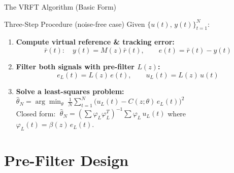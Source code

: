 \documentclass[hyperref={pdfpagemode=FullScreen},aspectratio=169]{beamer}
\begin{document}
\begin{frame}{The VRFT Algorithm (Basic Form)}
  \begin{block}{Three-Step Procedure \quad (noise-free case)}
    Given $\{u(t),\, y(t)\}_{t=1}^{N}$:
    \begin{enumerate}
      \item \textbf{Compute virtual reference \& tracking error:}
        \[ \bar{r}(t): \quad y(t)=M(z)\bar{r}(t), \qquad e(t)=\bar{r}(t)-y(t) \]
      \item \textbf{Filter both signals with pre-filter $L(z)$:}
        \[ e_L(t) = L(z)\,e(t), \qquad u_L(t) = L(z)\,u(t) \]
      \item \textbf{Solve a least-squares problem:} $\displaystyle \hat{\theta}_N = \arg\min_\theta \; \frac{1}{N}\sum_{t=1}^{N}\bigl(u_L(t) - C(z;\theta)\,e_L(t)\bigr)^2 $ \\
        Closed form: $\;\hat{\theta}_N = \left(\sum \varphi_L\varphi_L^T\right)^{-1}\sum \varphi_L\, u_L(t)$
        \quad where $\varphi_L(t)=\beta(z)\,e_L(t)$.
    \end{enumerate}
  \end{block}
\end{frame}

\section{Pre-Filter Design}
\end{document}
